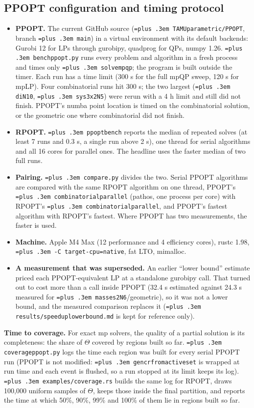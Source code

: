 \documentclass[10pt,a4paper]{article}
\newcommand{\rpopt}{RPOPT}
\newcommand{\ppopt}{PPOPT}
\newcommand{\code}[1]{{\let\_\bu\texttt{\spaceskip=\fontdimen2\font plus .3em #1}}}
\newcommand{\bu}{\textunderscore\hspace{0pt}}
\begin{document}
\subsection{PPOPT configuration and timing protocol}

\begin{itemize}
  \item \textbf{\ppopt{}.} The current GitHub source (\code{TAMUparametric/PPOPT}, branch \code{main}) in a virtual environment with its
    default backends: Gurobi 12 for LPs through gurobipy, quadprog for QPs, numpy 1.26. \code{bench\_ppopt.py} runs every problem and
    algorithm in a fresh process and times only \code{solve\_mpqp}; the program is built outside the timer. Each run has a time limit (300 s for the full
    mpQP sweep, 120 s for mpLP). Four combinatorial runs hit 300 s; the two largest (\code{di\_N10}, \code{sys3x2\_N5}) were rerun with a 4 h limit and still did not finish. \ppopt{}'s numba point
    location is timed on the combinatorial solution, or the geometric one where combinatorial did not finish.
  \item \textbf{\rpopt{}.} \code{ppopt\_bench} reports the median of repeated solves (at least 7 runs and 0.3 s, a single run above 2 s),
    one thread for serial algorithms and all 16 cores for parallel ones. The headline uses the faster median of two full runs.
  \item \textbf{Pairing.} \code{compare.py} divides the two. Serial \ppopt{} algorithms are compared with the same \rpopt{} algorithm on one
    thread, \ppopt{}'s \code{combinatorial\_parallel} (pathos, one process per core) with \rpopt{}'s \code{combinatorial\_parallel}, and
    \ppopt{}'s fastest algorithm with \rpopt{}'s fastest. Where \ppopt{} has two measurements, the faster is used.
  \item \textbf{Machine.} Apple M4 Max (12 performance and 4 efficiency cores), rustc 1.98, \code{-C target-cpu=native}, fat LTO, mimalloc.
  \item \textbf{A measurement that was superseded.} An earlier ``lower bound'' estimate priced each \ppopt{}-equivalent LP at a standalone gurobipy
    call. That turned out to cost more than a call inside \ppopt{} (32.4 s estimated against 24.3 s measured for \code{masses2\_N6}/geometric), so it
    was not a lower bound, and the measured comparison replaces it (\code{results/speedup\_lower\_bound.md} is kept for reference only).
\end{itemize}

\textbf{Time to coverage.} For exact mp solvers, the quality of a partial solution is its completeness: the share of $\Theta$ covered by
regions built so far. \code{coverage\_ppopt.py} logs the time each region was built for every serial \ppopt{} run (\ppopt{} is not modified:
\code{gen\_cr\_from\_active\_set} is wrapped at run time and each event is flushed, so a run stopped at its limit keeps its log).
\code{examples/coverage.rs} builds the same log for \rpopt{}, draws 100,000 uniform samples of $\Theta$, keeps those inside the final
partition, and reports the time at which 50\%, 90\%, 99\% and 100\% of them lie in regions built so far.
\end{document}
